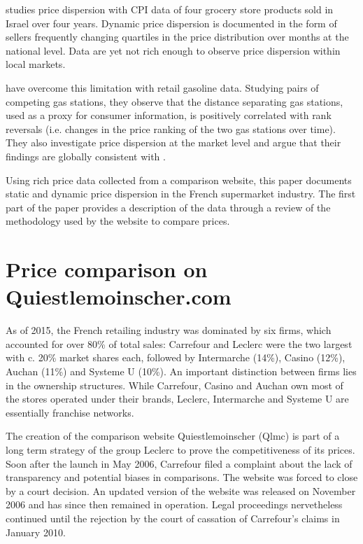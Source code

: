 \documentclass[english]{article}
\begin{document}
\cite{LAC02} studies price dispersion with CPI data of four grocery store products sold in Israel over four years. Dynamic price dispersion is documented in the form of sellers frequently changing quartiles in the price distribution over months at the national level. Data are yet not rich enough to observe price dispersion within local markets.

\cite{TAP11} have overcome this limitation with retail gasoline data. Studying pairs of competing gas stations, they observe that the distance separating gas stations, used as a proxy for consumer information, is positively correlated with rank reversals (i.e. changes in the price ranking of the two gas stations over time). They also investigate price dispersion at the market level and argue that their findings are globally consistent with \cite{VAR80}.

Using rich price data collected from a comparison website, this paper documents static and dynamic price dispersion in the French supermarket industry. The first part of the paper provides a description of the data through a review of the methodology used by the website to compare prices.

\section{Price comparison on Quiestlemoinscher.com}

As of 2015, the French retailing industry was dominated by six firms, which accounted for over 80\% of total sales: Carrefour and Leclerc were the two largest with c. 20\% market shares each, followed by Intermarche (14\%), Casino (12\%), Auchan (11\%) and Systeme U (10\%). An important distinction between firms lies in the ownership structures. While Carrefour, Casino and Auchan own most of the stores operated under their brands, Leclerc, Intermarche and Systeme U are essentially franchise networks.

The creation of the comparison website Quiestlemoinscher (Qlmc) is part of a long term strategy of the group Leclerc to prove the competitiveness of its prices. Soon after the launch in May 2006, Carrefour filed a complaint about the lack of transparency and potential biases in comparisons. The website was forced to close by a court decision. An updated version of the website was released on November 2006 and has since then remained in operation. Legal proceedings nervetheless continued until the rejection by the court of cassation of Carrefour's claims in January 2010.
\end{document}
